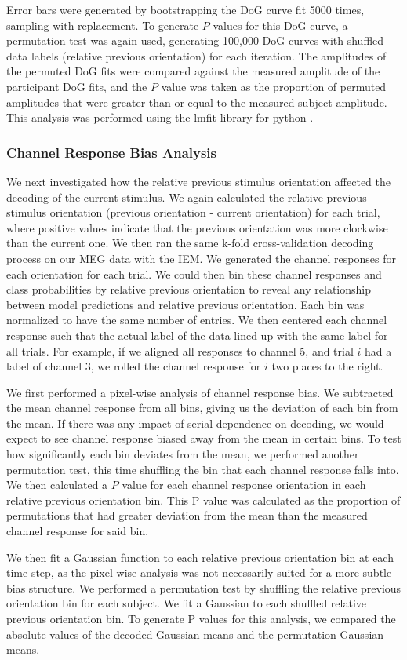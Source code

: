 \documentclass[../main.tex]{subfiles}
\begin{document}
Error bars were generated by bootstrapping the DoG curve fit 5000 times, sampling with replacement. To generate $P$ values for this DoG curve, a permutation test was again used, generating 100,000 DoG curves with shuffled data labels (relative previous orientation) for each iteration. The amplitudes of the permuted DoG fits were compared against the measured amplitude of the participant DoG fits, and the $P$ value was taken as the proportion of permuted amplitudes that were greater than or equal to the measured subject amplitude. This analysis was performed using the lmfit library for python \citep{newville_matthew_2014_11813}.



\subsubsection*{Channel Response Bias Analysis}
We next investigated how the relative previous stimulus orientation affected the decoding of the current stimulus. We again calculated the relative previous stimulus orientation (previous orientation - current orientation) for each trial, where positive values indicate that the previous orientation was more clockwise than the current one. We then ran the same k-fold cross-validation decoding process on our MEG data with the IEM. We generated the channel responses for each orientation for each trial. We could then bin these channel responses and class probabilities by relative previous orientation to reveal any relationship between model predictions and relative previous orientation. Each bin was normalized to have the same number of entries. We then centered each channel response such that the actual label of the data lined up with the same label for all trials. For example, if we aligned all responses to channel 5, and trial $i$ had a label of channel 3, we rolled the channel response for $i$ two places to the right. 

We first performed a pixel-wise analysis of channel response bias. We subtracted the mean channel response from all bins, giving us the deviation of each bin from the mean. If there was any impact of serial dependence on decoding, we would expect to see channel response biased away from the mean in certain bins. To test how significantly each bin deviates from the mean, we performed another permutation test, this time shuffling the bin that each channel response falls into. We then calculated a $P$ value for each channel response orientation in each relative previous orientation bin. This P value was calculated as the proportion of permutations that had greater deviation from the mean than the measured channel response for said bin.

We then fit a Gaussian function to each relative previous orientation bin at each time step, as the pixel-wise analysis was not necessarily suited for a more subtle bias structure. We performed a permutation test by shuffling the relative previous orientation bin for each subject. We fit a Gaussian to each shuffled relative previous orientation bin. To generate P values for this analysis, we compared the absolute values of the decoded Gaussian means and the permutation Gaussian means.
\end{document}
